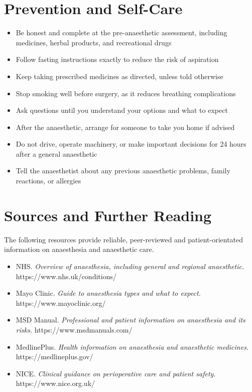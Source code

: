 \section*{Prevention and Self-Care}
\begin{itemize}
    \item Be honest and complete at the pre-anaesthetic assessment, including medicines, herbal products, and recreational drugs
    \item Follow fasting instructions exactly to reduce the risk of aspiration
    \item Keep taking prescribed medicines as directed, unless told otherwise
    \item Stop smoking well before surgery, as it reduces breathing complications
    \item Ask questions until you understand your options and what to expect
    \item After the anaesthetic, arrange for someone to take you home if advised
    \item Do not drive, operate machinery, or make important decisions for 24 hours after a general anaesthetic
    \item Tell the anaesthetist about any previous anaesthetic problems, family reactions, or allergies
\end{itemize}

\section*{Sources and Further Reading}
The following resources provide reliable, peer-reviewed and patient-orientated information on anaesthesia and anaesthetic care.

\begin{itemize}
    \item NHS. \textit{Overview of anaesthesia, including general and regional anaesthetic.} https://www.nhs.uk/conditions/
    \item Mayo Clinic. \textit{Guide to anaesthesia types and what to expect.} https://www.mayoclinic.org/
    \item MSD Manual. \textit{Professional and patient information on anaesthesia and its risks.} https://www.msdmanuals.com/
    \item MedlinePlus. \textit{Health information on anaesthesia and anaesthetic medicines.} https://medlineplus.gov/
    \item NICE. \textit{Clinical guidance on perioperative care and patient safety.} https://www.nice.org.uk/
\end{itemize}
